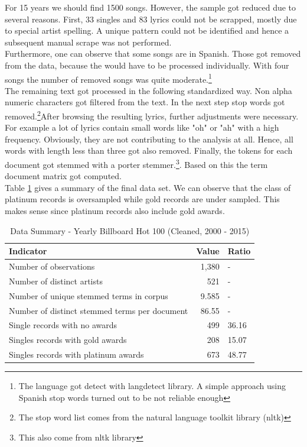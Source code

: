 \documentclass[12pt,a4paper,bibliography=totocnumbered,listof=totocnumbered]{scrartcl}
\begin{document}
For 15 years we should find 1500 songs. However, the sample got reduced due to several reasons. First, 33 singles and 83 lyrics could not be scrapped, mostly due to special artist spelling. A unique pattern could not be identified and hence a subsequent manual scrape was not performed.\\
Furthermore, one can observe that some songs are in Spanish. Those got removed from the data, because the would have to be processed individually. With four songs the number of removed songs was quite moderate.\footnote{The language got detect with langdetect library. A simple approach using Spanish stop words turned out to be not reliable enough}\\ 
The remaining text got processed in the following standardized way. Non alpha numeric characters got filtered from the text. In the next step stop words got removed.\footnote{The stop word list comes from the natural language toolkit library (nltk)}After browsing the resulting lyrics, further adjustments were necessary. For example a lot of lyrics contain small words like "oh" or "ah" with a high frequency. Obviously, they are not contributing to the analysis at all. Hence, all words with length less than three got also removed. Finally, the tokens for each document got stemmed with a porter stemmer.\footnote{ This also come from nltk library}. Based on this the term document matrix got computed.\\

Table \ref{tab:summary} gives a summary of the final data set. We can observe that the class of platinum records is oversampled while gold records are under sampled. This makes  sense since platinum records also include gold awards.

\begin{table}[H]
	\centering
	\footnotesize
	\begin{tabular}{l r l}
		\toprule 
		\textbf{Indicator} & \textbf{Value} & \textbf{Ratio} \\
		\hline
		Number of observations & 1,380 & -\\
		Number of distinct artists & 521  & - \\
		Number of unique stemmed terms in corpus & 9.585 & -  \\
		Number of distinct stemmed terms per document & 86.55 & - \\
		Single records with no awards & 499  &  36.16  \\
		Singles records with gold awards & 208  & 15.07  \\
		Singles records with platinum awards & 673 & 48.77 \\
		\bottomrule 
	\end{tabular}
		\caption{Data Summary - Yearly Billboard Hot 100 (Cleaned, 2000 - 2015)}
		\label{tab:summary}
\end{table}
\pagebreak
\end{document}
